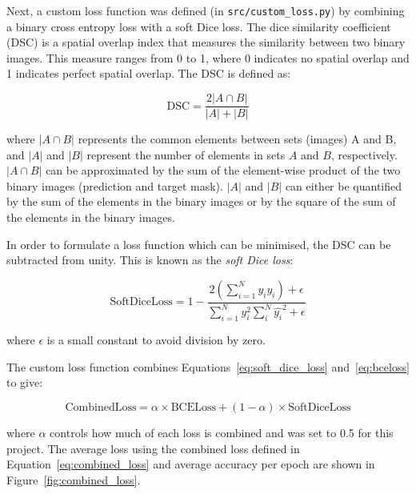 \documentclass[12pt]{report}
\newcommand{\inlinecode}[1]{\lstinline[style=inline]{#1}}
\begin{document}
Next, a custom loss function was defined (in \inlinecode{src/custom_loss.py}) by combining a binary cross entropy loss with a soft Dice loss. The dice similarity coefficient (DSC) is a spatial overlap index that measures the similarity between two binary images. This measure ranges from 0 to 1, where 0 indicates no spatial overlap and 1 indicates perfect spatial overlap. The DSC is defined as:

\begin{equation}
    \text{DSC} = \frac{2\left | A\cap B \right |}{\left | A \right | + \left |  B \right |}
    \label{eq:DSC}
\end{equation}

where $\left | A\cap B \right |$ represents the common elements between sets (images) A and B, and $\left | A \right |$ and $\left | B \right |$ represent the number of elements in sets $A$ and $B$, respectively. $\left | A\cap B \right |$ can be approximated by the sum of the element-wise product of the two binary images (prediction and target mask). $\left | A \right |$ and $\left | B \right |$ can either be quantified by the sum of the elements in the binary images or by the square of the sum of the elements in the binary images.\cite{zou_statistical_2004}

In order to formulate a loss function which can be minimised, the DSC can be subtracted from unity. This is known as the \textit{soft Dice loss}:

\begin{equation}
    \text{SoftDiceLoss} = 1 - \frac{2 (\sum_{i=1}^{N} y_{i}\hat{y_{i}})+\epsilon}{\sum_{i=1}^{N} y_{i}^{2}\sum_{i}^{N} \hat{y_{i}}^{2} + \epsilon}
    \label{eq:soft_dice_loss}
\end{equation}

where $\epsilon$ is a small constant to avoid division by zero.\cite{noauthor_optimizing_nodate} 

The custom loss function combines Equations~\ref{eq:soft_dice_loss} and~\ref{eq:bceloss} to give:

\begin{equation}
    \text{CombinedLoss} = \alpha \times \text{BCELoss} + (1 - \alpha) \times \text{SoftDiceLoss}
    \label{eq:combined_loss}
\end{equation}

where $\alpha$ controls how much of each loss is combined and was set to 0.5 for this project. The average loss using the combined loss defined in Equation~\ref{eq:combined_loss} and average accuracy per epoch are shown in Figure~\ref{fig:combined_loss}.
\end{document}
